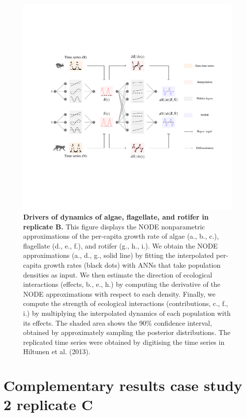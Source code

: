 \documentclass[11pt, oneside]{article}
\begin{document}
\newpage
\begin{figure}[H]
\includegraphics[width=1\linewidth,page=12]{figures/main.pdf}
\caption{
    \textbf{Drivers of dynamics of algae, flagellate, and rotifer in replicate B.}
    This figure displays the NODE nonparametric approximations of the per-capita growth rate of algae (a., b., c.), flagellate (d., e., f.), and rotifer (g., h., i.).
    We obtain the NODE approximations (a., d., g., solid line) by fitting the interpolated per-capita growth rates (black dots) with ANNs that take population densities as input.
    We then estimate the direction of ecological interactions (effects, b., e., h.) by computing the derivative of the NODE approximations with respect to each density.
    Finally, we compute the strength of ecological interactions (contributions, c., f., i.) by multiplying the interpolated dynamics of each population with its effects.
    The shaded area shows the 90\% confidence interval, obtained by approximately sampling the posterior distributions. 
    The replicated time series were obtained by digitising the time series in Hiltunen et al. (2013).
}
\end{figure}
\newpage

\newpage
\section{Complementary results case study 2 replicate C}
\end{document}

